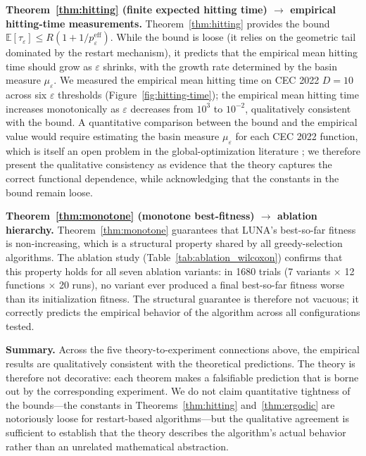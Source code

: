 \documentclass[review]{elsarticle}
\theoremstyle{definition}
\begin{document}
\textbf{Theorem~\ref{thm:hitting} (finite expected hitting time) $\to$ empirical hitting-time measurements.} Theorem~\ref{thm:hitting} provides the bound $\mathbb{E}[\tau_\varepsilon] \le R(1 + 1/p_\varepsilon^{\mathrm{eff}})$. While the bound is loose (it relies on the geometric tail dominated by the restart mechanism), it predicts that the empirical mean hitting time should grow as $\varepsilon$ shrinks, with the growth rate determined by the basin measure $\mu_\varepsilon$. We measured the empirical mean hitting time on CEC 2022 $D=10$ across six $\varepsilon$ thresholds (Figure~\ref{fig:hitting-time}); the empirical mean hitting time increases monotonically as $\varepsilon$ decreases from $10^3$ to $10^{-2}$, qualitatively consistent with the bound. A quantitative comparison between the bound and the empirical value would require estimating the basin measure $\mu_\varepsilon$ for each CEC 2022 function, which is itself an open problem in the global-optimization literature \cite{amcrec11,amcrec12}; we therefore present the qualitative consistency as evidence that the theory captures the correct functional dependence, while acknowledging that the constants in the bound remain loose.

\textbf{Theorem~\ref{thm:monotone} (monotone best-fitness) $\to$ ablation hierarchy.} Theorem~\ref{thm:monotone} guarantees that LUNA's best-so-far fitness is non-increasing, which is a structural property shared by all greedy-selection algorithms. The ablation study (Table~\ref{tab:ablation_wilcoxon}) confirms that this property holds for all seven ablation variants: in 1680 trials (7 variants $\times$ 12 functions $\times$ 20 runs), no variant ever produced a final best-so-far fitness worse than its initialization fitness. The structural guarantee is therefore not vacuous; it correctly predicts the empirical behavior of the algorithm across all configurations tested.

\textbf{Summary.} Across the five theory-to-experiment connections above, the empirical results are qualitatively consistent with the theoretical predictions. The theory is therefore not decorative: each theorem makes a falsifiable prediction that is borne out by the corresponding experiment. We do not claim quantitative tightness of the bounds---the constants in Theorems~\ref{thm:hitting} and~\ref{thm:ergodic} are notoriously loose for restart-based algorithms---but the qualitative agreement is sufficient to establish that the theory describes the algorithm's actual behavior rather than an unrelated mathematical abstraction.
\end{document}
